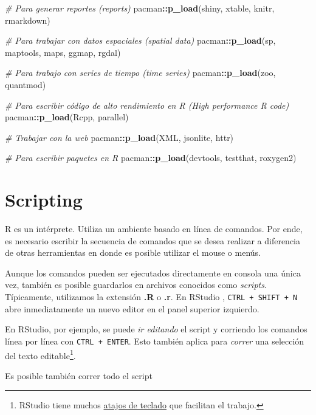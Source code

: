 \documentclass[]{article}
\newenvironment{Shaded}{\begin{snugshade}}{\end{snugshade}}
\newcommand{\KeywordTok}[1]{\textcolor[rgb]{0.13,0.29,0.53}{\textbf{#1}}}
\newcommand{\CommentTok}[1]{\textcolor[rgb]{0.56,0.35,0.01}{\textit{#1}}}
\newcommand{\OperatorTok}[1]{\textcolor[rgb]{0.81,0.36,0.00}{\textbf{#1}}}
\newcommand{\NormalTok}[1]{#1}
\let\rmarkdownfootnote\footnote%
\def\footnote{\protect\rmarkdownfootnote}
\begin{document}
\begin{Shaded}
\begin{Highlighting}[]
\CommentTok{# Para generar reportes (reports)}
\NormalTok{pacman}\OperatorTok{::}\KeywordTok{p_load}\NormalTok{(shiny, xtable, knitr, rmarkdown)}

\CommentTok{# Para trabajar con datos espaciales (spatial data)}
\NormalTok{pacman}\OperatorTok{::}\KeywordTok{p_load}\NormalTok{(sp, maptools, maps, ggmap, rgdal)}

\CommentTok{# Para trabajo con series de tiempo (time series)}
\NormalTok{pacman}\OperatorTok{::}\KeywordTok{p_load}\NormalTok{(zoo, quantmod)}

\CommentTok{# Para escribir código de alto rendimiento en R (High performance R code)}
\NormalTok{pacman}\OperatorTok{::}\KeywordTok{p_load}\NormalTok{(Rcpp, parallel)}

\CommentTok{# Trabajar con la web }
\NormalTok{pacman}\OperatorTok{::}\KeywordTok{p_load}\NormalTok{(XML, jsonlite, httr)}

\CommentTok{# Para escribir paquetes en R}
\NormalTok{pacman}\OperatorTok{::}\KeywordTok{p_load}\NormalTok{(devtools, testthat, roxygen2)}
\end{Highlighting}
\end{Shaded}

\section{Scripting}\label{scripting}

R es un intérprete. Utiliza un ambiente basado en línea de comandos. Por
ende, es necesario escribir la secuencia de comandos que se desea
realizar a diferencia de otras herramientas en donde es posible utilizar
el mouse o menús.

Aunque los comandos pueden ser ejecutados directamente en consola una
única vez, también es posible guardarlos en archivos conocidos como
\emph{scripts}. Típicamente, utilizamos la extensión \textbf{.R} o
\textbf{.r}. En RStudio \parencite{rstudio},
\texttt{CTRL\ +\ SHIFT\ +\ N} abre inmediatamente un nuevo editor en el
panel superior izquierdo.

En RStudio, por ejemplo, se puede \emph{ir editando} el script y
corriendo los comandos línea por línea con \texttt{CTRL\ +\ ENTER}. Esto
también aplica para \emph{correr} una selección del texto
editable\footnote{RStudio tiene muchos
  \href{https://support.rstudio.com/hc/en-us/articles/200711853-Keyboard-Shortcuts}{atajos
  de teclado} que facilitan el trabajo.}.

Es posible también correr todo el script
\end{document}
